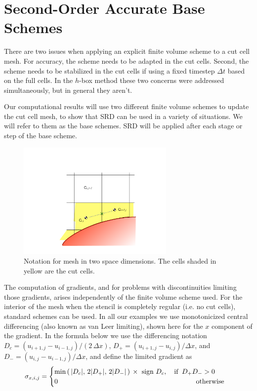 \section{Second-Order Accurate Base Schemes}\label{sec:basefv}

There are two issues when applying an explicit finite volume scheme to a cut cell
mesh.  
For accuracy, the scheme needs to be adapted in the cut cells. Second, 
the scheme needs to be stabilized in the cut cells if using a fixed timestep $\Delta t$ 
based on the full cells. In the $h$-box method these two concerns were addressed
simultaneously, but in general they aren't.

Our computational results will use two different finite volume schemes
to update the cut cell mesh, to show that SRD can be used in a
variety of situations.
We will refer to them as the base schemes. 
SRD will be applied after each stage or step of the base scheme.

\begin{figure}
\begin{center}
\includegraphics[width=3.0in]{figs/2dfig.pdf}
\caption{\sf Notation for mesh in two space dimensions. The cells shaded
in yellow are the cut cells.} 
\label{fig:2dfig}
\end{center}
\end{figure}

The computation of  gradients, and for problems with discontinuities limiting
those gradients, arises independently of the finite volume scheme used. 
For the interior of the mesh when the stencil is completely regular (i.e. no cut
cells), standard schemes can be used.
In all our examples we use monotonicized central differencing (also known
as van Leer limiting), shown here for the $x$
component of the gradient. In the formula below we use the differencing notation
$D_c = (u_{i+1,j}-u_{i-1,j})/(2 \, \Delta x)$,
$D_+ = (u_{i+1,j}-u_{i,j})/\Delta x$, and
$D_- = (u_{i,j}-u_{i-1,j})/\Delta x$, and define the limited gradient as
\begin{equation}
\sigma_{x,i,j} =  \begin{cases} 
                       \min \left ( \,  \lvert{ D_c}\rvert,\,
                       2 \lvert {D_+}\rvert,\,
                      2 \lvert{D_-}\rvert \,  \right ) \,\times 
                      \text{ sign } D_c, \quad \text{if} \;\;  D_+ D_- >  0\\
                      0 \hspace*{2.8in} \text{otherwise}
                      \end{cases}
\end{equation}

